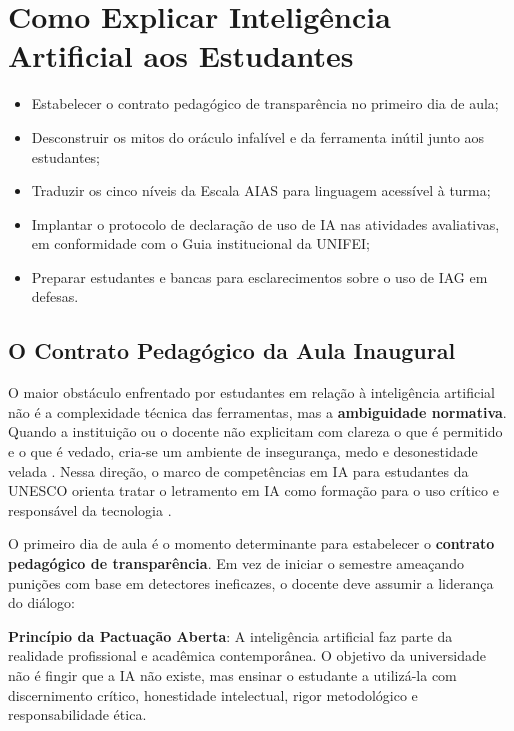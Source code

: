 \chapter{Como Explicar Intelig{\^e}ncia Artificial aos Estudantes}
\label{cap:explicar-estudantes}

\begin{objetivos}
\begin{itemize}
  \item Estabelecer o contrato pedag{\'o}gico de transpar{\^e}ncia no primeiro dia de aula;
  \item Desconstruir os mitos do or{\'a}culo infal{\'i}vel e da ferramenta in{\'u}til junto aos estudantes;
  \item Traduzir os cinco n{\'i}veis da Escala AIAS para linguagem acess{\'i}vel \`a turma;
  \item Implantar o protocolo de declara{\c c}{\~a}o de uso de IA nas atividades avaliativas, em conformidade com o Guia institucional da UNIFEI;
  \item Preparar estudantes e bancas para esclarecimentos sobre o uso de IAG em defesas.
\end{itemize}
\end{objetivos}

\section{O Contrato Pedag{\'o}gico da Aula Inaugural}

O maior obst{\'a}culo enfrentado por estudantes em rela{\c c}{\~a}o {\`a} intelig{\^e}ncia artificial n{\~a}o {\'e} a complexidade t{\'e}cnica das ferramentas, mas a \textbf{ambiguidade normativa}. Quando a institui{\c c}{\~a}o ou o docente n{\~a}o explicitam com clareza o que {\'e} permitido e o que {\'e} vedado, cria-se um ambiente de inseguran{\c c}a, medo e desonestidade velada \cite{perkins2024aias}. Nessa dire{\c c}{\~a}o, o marco de compet{\^e}ncias em IA para estudantes da UNESCO orienta tratar o letramento em IA como forma{\c c}{\~a}o para o uso cr{\'i}tico e respons{\'a}vel da tecnologia \cite{unesco2024framework}.

O primeiro dia de aula {\'e} o momento determinante para estabelecer o \textbf{contrato pedag{\'o}gico de transpar{\^e}ncia}. Em vez de iniciar o semestre amea{\c c}ando puni{\c c}{\~o}es com base em detectores ineficazes, o docente deve assumir a lideran{\c c}a do di{\'a}logo:

\begin{conceitochave}
\textbf{Princ{\'i}pio da Pactua{\c c}{\~a}o Aberta}: A intelig{\^e}ncia artificial faz parte da realidade profissional e acad{\^e}mica contempor{\^a}nea. O objetivo da universidade n{\~a}o {\'e} fingir que a IA n{\~a}o existe, mas ensinar o estudante a utiliz{\'a}-la com discernimento cr{\'i}tico, honestidade intelectual, rigor metodol{\'o}gico e responsabilidade {\'e}tica.
\end{conceitochave}

